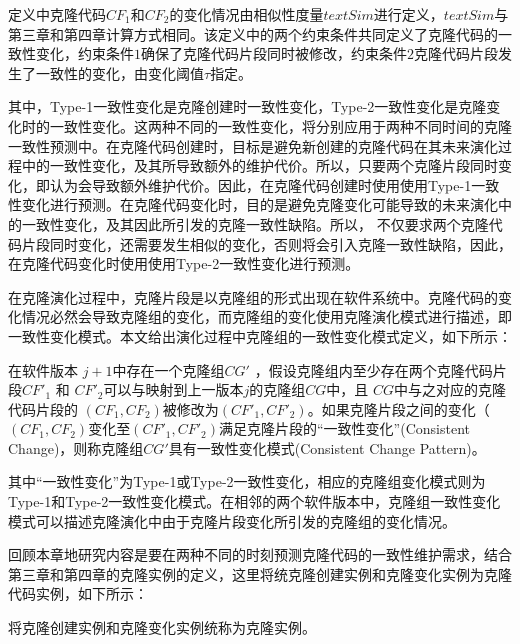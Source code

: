 定义中克隆代码$ CF_1 $和$ CF_2 $的变化情况由相似性度量$ \mathit {textSim} $进行定义，$textSim$与第三章和第四章计算方式相同。该定义中的两个约束条件共同定义了克隆代码的一致性变化，约束条件$1$确保了克隆代码片段同时被修改，约束条件$2$克隆代码片段发生了一致性的变化，由变化阈值$\tau$指定。

其中，Type-1一致性变化是克隆创建时一致性变化，Type-2一致性变化是克隆变化时的一致性变化。这两种不同的一致性变化，将分别应用于两种不同时间的克隆一致性预测中。在克隆代码创建时，目标是避免新创建的克隆代码在其未来演化过程中的一致性变化，及其所导致额外的维护代价。所以，只要两个克隆片段同时变化，即认为会导致额外维护代价。因此，在克隆代码创建时使用使用Type-1一致性变化进行预测。在克隆代码变化时，目的是避免克隆变化可能导致的未来演化中的一致性变化，及其因此所引发的克隆一致性缺陷。所以， 不仅要求两个克隆代码片段同时变化，还需要发生相似的变化，否则将会引入克隆一致性缺陷，因此，在克隆代码变化时使用使用Type-2一致性变化进行预测。

在克隆演化过程中，克隆片段是以克隆组的形式出现在软件系统中。克隆代码的变化情况必然会导致克隆组的变化，而克隆组的变化使用克隆演化模式进行描述，即一致性变化模式。本文给出演化过程中克隆组的一致性变化模式定义，如下所示：\\


\begin{definition}[一致性变化模式] 
\label{def-pattern}
在软件版本 $j+1$中存在一个克隆组$CG'$ ，假设克隆组内至少存在两个克隆代码片段$CF'_1$ 和 $CF'_2$可以与映射到上一版本$j$的克隆组$CG$中，且 $CG$中与之对应的克隆代码片段的 $(CF_1,CF_2)$被修改为$(CF'_1,CF'_2)$。如果克隆片段之间的变化（ $(CF_1,CF_2)$变化至$(CF'_1,CF'_2)$满足克隆片段的“一致性变化”(Consistent Change)，则称克隆组$CG'$具有一致性变化模式(Consistent Change Pattern)。
\end{definition}

其中“一致性变化”为Type-1或Type-2一致性变化，相应的克隆组变化模式则为Type-1和Type-2一致性变化模式。在相邻的两个软件版本中，克隆组一致性变化模式可以描述克隆演化中由于克隆片段变化所引发的克隆组的变化情况。

回顾本章地研究内容是要在两种不同的时刻预测克隆代码的一致性维护需求，结合第三章和第四章的克隆实例的定义，这里将统克隆创建实例和克隆变化实例为克隆代码实例，如下所示：\\

\begin{definition}[克隆实例] 
\label{def-instance}
将克隆创建实例和克隆变化实例统称为克隆实例。
\end{definition}

